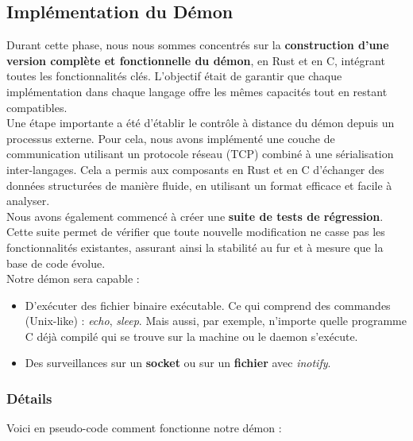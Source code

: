 \documentclass{article}
\begin{document}
\subsection{Implémentation du Démon}


Durant cette phase, nous nous sommes concentrés sur la \textbf{construction d’une version complète et fonctionnelle du démon}, en Rust et en C, intégrant toutes les fonctionnalités clés. L’objectif était de garantir que chaque implémentation dans chaque langage offre les mêmes capacités tout en restant compatibles.\\

Une étape importante a été d’établir le contrôle à distance du démon depuis un processus externe. Pour cela, nous avons implémenté une couche de communication utilisant un protocole réseau (TCP) combiné à une sérialisation inter-langages. Cela a permis aux composants en Rust et en C d’échanger des données structurées de manière fluide, en utilisant un format efficace et facile à analyser.\\

Nous avons également commencé à créer une \textbf{suite de tests de régression}. Cette suite permet de vérifier que toute nouvelle modification ne casse pas les fonctionnalités existantes, assurant ainsi la stabilité au fur et à mesure que la base de code évolue.\\

Notre démon sera capable : 
\begin{itemize}
    \item D'exécuter des fichier binaire exécutable. Ce qui comprend des commandes (Unix-like) : \textit{echo}, \textit{sleep}. Mais aussi, par exemple, n'importe quelle programme C déjà compilé qui se trouve sur la machine ou le daemon s'exécute.
    \item Des surveillances sur un \textbf{socket} ou sur un \textbf{fichier} avec \textit{inotify}.
\end{itemize}


\subsubsection{Détails}

Voici en pseudo-code comment fonctionne notre démon :
\end{document}
